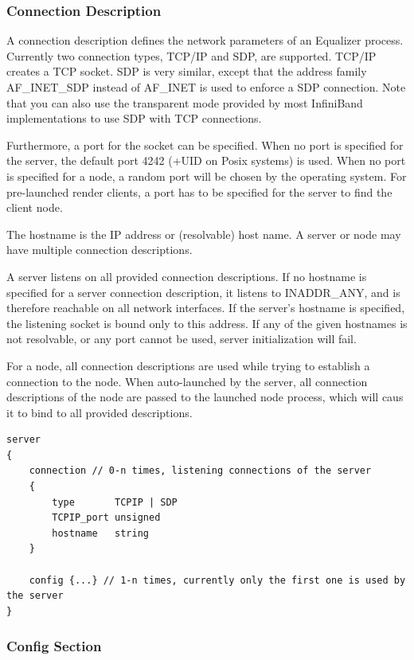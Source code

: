 \documentclass[10pt,a4]{scrartcl}
\begin{document}
\subsubsection{\label{sConnectionDescription}Connection Description}

A connection description defines the network parameters of an Equalizer
process. Currently two connection types, TCP/IP and SDP, are
supported. TCP/IP creates a TCP socket. SDP is very similar, except that
the address family \textsf{AF\_INET\_SDP} instead of \textsf{AF\_INET}
is used to enforce a SDP connection. Note that you can also use the
transparent mode provided by most InfiniBand implementations to use SDP
with TCP connections. 

Furthermore, a port for the socket can be specified. When no port is
specified for the server, the default port 4242 (+UID on Posix systems)
is used. When no port is specified for a node, a random port will be
chosen by the operating system. For pre-launched render clients, a port
has to be specified for the server to find the client node.

The hostname is the IP address or (resolvable) host name. A server or
node may have multiple connection descriptions. 

A server listens on all provided connection descriptions. If no hostname
is specified for a server connection description, it listens to
INADDR\_ANY, and is therefore reachable on all network interfaces. If
the server's hostname is specified, the listening socket is bound only
to this address. If any of the given hostnames is not resolvable, or any
port cannot be used, server initialization will fail.

For a node, all connection descriptions are used while trying to
establish a connection to the node. When auto-launched by the server,
all connection descriptions of the node are passed to the launched node
process, which will caus it to bind to all provided descriptions.

{\footnotesize\begin{lstlisting}
server
{
    connection // 0-n times, listening connections of the server
    {
        type       TCPIP | SDP
        TCPIP_port unsigned
        hostname   string
    }

    config {...} // 1-n times, currently only the first one is used by the server
}
\end{lstlisting}}

\subsubsection{Config Section}
\end{document}
